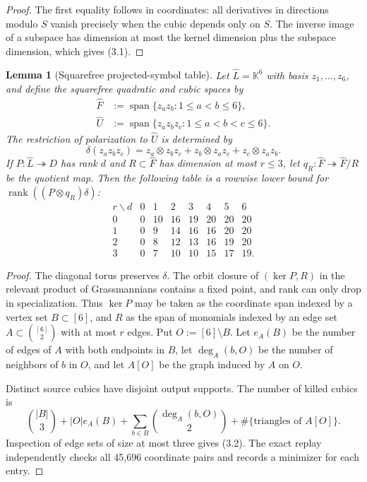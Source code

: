 \documentclass[11pt]{amsart}
\newcommand{\K}{\mathbb{K}}
\newcommand{\Span}{\operatorname{span}}
\newcommand{\rank}{\operatorname{rank}}
\newtheorem{lemma}[theorem]{Lemma}
\theoremstyle{definition}
\begin{document}
\begin{proof}
The first equality follows in coordinates: all derivatives in directions
modulo \(S\) vanish precisely when the cubic depends only on \(S\). The
inverse image of a subspace has dimension at most the kernel dimension plus
the subspace dimension, which gives (3.1).
\end{proof}

\begin{lemma}[Squarefree projected-symbol table]\label{lem:squarefree}
Let \(\widehat L=\K^6\) with basis \(z_1,\ldots,z_6\), and define the
squarefree quadratic and cubic spaces by
\[
 \begin{aligned}
 \widehat F&:=\Span\{z_az_b:1\le a<b\le6\},\\
 \widehat U&:=\Span\{z_az_bz_c:1\le a<b<c\le6\}.
 \end{aligned}
\]
The restriction of polarization to \(\widehat U\) is determined by
\[
 \delta(z_az_bz_c)=z_a\otimes z_bz_c+z_b\otimes z_az_c
                    +z_c\otimes z_az_b.
\]
If \(P:\widehat L\twoheadrightarrow D\) has rank \(d\) and
\(R\subset\widehat F\) has dimension at most \(r\le3\), let
\(q_R:\widehat F\twoheadrightarrow\widehat F/R\) be the quotient map. Then the following
table is a rowwise lower bound for
\(\rank((P\otimes q_R)\delta)\):
\[
\begin{array}{c|rrrrrrr}
r\backslash d&0&1&2&3&4&5&6\\ \hline
0&0&10&16&19&20&20&20\\
1&0&9&14&16&16&20&20\\
2&0&8&12&13&16&19&20\\
3&0&7&10&10&15&17&19.
\end{array} \tag{3.2}
\]
\end{lemma}

\begin{proof}
The diagonal torus preserves \(\delta\). The orbit closure of
\((\ker P,R)\) in the relevant product of Grassmannians contains a fixed
point, and rank can only drop in specialization. Thus \(\ker P\) may be
taken as the coordinate span indexed by a vertex set \(B\subset[6]\), and
\(R\) as the span of monomials indexed by an edge set
\(A\subset\binom{[6]}2\) with at most \(r\) edges. Put
\(O:=[6]\setminus B\). Let \(e_A(B)\) be the number of edges of \(A\) with
both endpoints in \(B\), let \(\deg_A(b,O)\) be the number of neighbors of
\(b\) in \(O\), and let \(A[O]\) be the graph induced by \(A\) on \(O\).

Distinct source cubics have disjoint output supports. The number of killed
cubics is
\[
 \binom{|B|}{3}+|O|e_A(B)
 +\sum_{b\in B}\binom{\deg_A(b,O)}2
 +\#\{\text{triangles of }A[O]\}. \tag{3.3}
\]
Inspection of edge sets of size at most three gives (3.2). The exact replay
independently checks all 45,696 coordinate pairs and records a minimizer for
each entry.
\end{proof}
\end{document}
